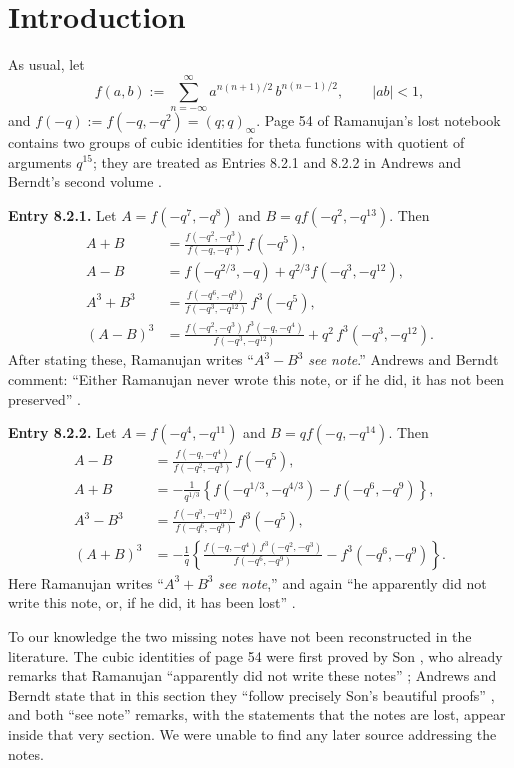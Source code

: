 \documentclass[pdflatex,sn-mathphys-num]{sn-jnl}
\theoremstyle{thmstyleone}%
\theoremstyle{thmstyletwo}%
\newcommand{\f}{f}
\begin{document}
\section{Introduction}
As usual, let
\[
\f(a,b):=\sum_{n=-\infty}^{\infty}a^{n(n+1)/2}\,b^{n(n-1)/2},\qquad |ab|<1,
\]
and $\f(-q):=\f(-q,-q^2)=(q;q)_\infty$. Page 54 of Ramanujan's lost notebook
\cite{LN} contains two groups of cubic identities for theta functions with
quotient of arguments $q^{15}$; they are treated as Entries 8.2.1 and 8.2.2 in
Andrews and Berndt's second volume \cite[pp.~176--178]{AB2}.

\textbf{Entry 8.2.1.} Let $A=\f(-q^7,-q^8)$ and $B=q\f(-q^2,-q^{13})$. Then
\begin{align}
A+B&=\frac{\f(-q^2,-q^3)}{\f(-q,-q^4)}\,\f(-q^5),\tag{8.2.6}\\
A-B&=\f(-q^{2/3},-q)+q^{2/3}\f(-q^3,-q^{12}),\tag{8.2.7}\\
A^3+B^3&=\frac{\f(-q^6,-q^9)}{\f(-q^3,-q^{12})}\,\f^3(-q^5),\tag{8.2.8}\\
(A-B)^3&=\frac{\f(-q^2,-q^3)\,\f^3(-q,-q^4)}{\f(-q^3,-q^{12})}+q^2\,\f^3(-q^3,-q^{12}).\tag{8.2.9}
\end{align}
After stating these, Ramanujan writes ``$A^3-B^3$ \emph{see note}.'' Andrews and
Berndt comment: ``Either Ramanujan never wrote this note, or if he did, it has
not been preserved'' \cite[p.~177]{AB2}.

\textbf{Entry 8.2.2.} Let $A=\f(-q^4,-q^{11})$ and $B=q\f(-q,-q^{14})$. Then
\begin{align}
A-B&=\frac{\f(-q,-q^4)}{\f(-q^2,-q^3)}\,\f(-q^5),\tag{8.2.10}\\
A+B&=-\frac{1}{q^{1/3}}\left\{\f(-q^{1/3},-q^{4/3})-\f(-q^6,-q^9)\right\},\tag{8.2.11}\\
A^3-B^3&=\frac{\f(-q^3,-q^{12})}{\f(-q^6,-q^9)}\,\f^3(-q^5),\tag{8.2.12}\\
(A+B)^3&=-\frac1q\left\{\frac{\f(-q,-q^4)\,\f^3(-q^2,-q^3)}{\f(-q^6,-q^9)}-\f^3(-q^6,-q^9)\right\}.\tag{8.2.13}
\end{align}
Here Ramanujan writes ``$A^3+B^3$ \emph{see note},'' and again ``he apparently
did not write this note, or, if he did, it has been lost'' \cite[p.~178]{AB2}.

To our knowledge the two missing notes have not been reconstructed in the
literature. The cubic identities of page 54 were first proved by Son
\cite{Son}, who already remarks that Ramanujan ``apparently did not write these
notes'' \cite[\S4]{Son}; Andrews and Berndt state that in this section they ``follow
precisely Son's beautiful proofs'' \cite[p.~173]{AB2}, and both ``see note''
remarks, with the statements that the notes are lost, appear inside that very
section. We were unable to find any later source addressing the notes.
\end{document}
